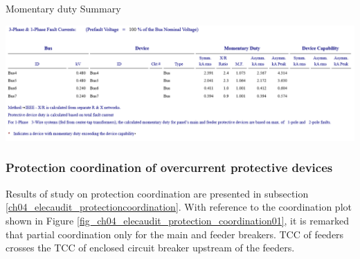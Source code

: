 \begin{table}[!htb]
	\caption{Momentary duty Summary}
	\label{tbl_ch04_elecaudit_momentarydutysummary}
	\includegraphics[width=\textwidth]{tables/tbl_ch04_elecaudit_momentarydutysummary} \\	
	
\end{table}


\subsubsection{Protection coordination of overcurrent protective devices}
Results of study on protection coordination are presented in subsection \ref{ch04_elecaudit_protectioncoordination}. With reference to the coordination plot shown in Figure \ref{fig_ch04_elecaudit_protection_coordination01}, it is remarked that partial coordination only for the main and feeder breakers. TCC of feeders crosses the TCC of enclosed circuit breaker upstream of the feeders.

